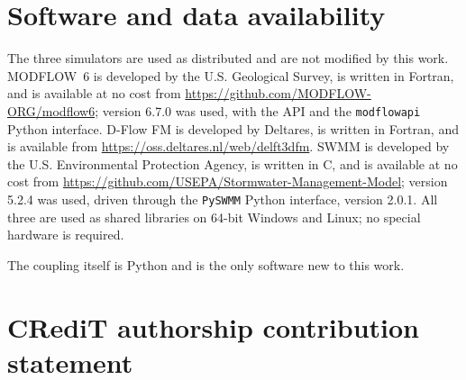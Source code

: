 \documentclass[preprint,authoryear,11pt]{elsarticle}
\begin{document}
\section*{Software and data availability}

The three simulators are used as distributed and are not modified by this work.
MODFLOW~6 is developed by the U.S. Geological Survey, is written in Fortran, and is
available at no cost from \url{https://github.com/MODFLOW-ORG/modflow6}; version
6.7.0 was used, with the API and the \texttt{modflowapi} Python interface. D-Flow FM
is developed by Deltares, is written in Fortran, and is available from
\url{https://oss.deltares.nl/web/delft3dfm}. SWMM is developed by the
U.S. Environmental Protection Agency, is written in C, and is available at no cost
from \url{https://github.com/USEPA/Stormwater-Management-Model}; version 5.2.4 was
used, driven through the \texttt{PySWMM} Python interface, version 2.0.1. All three
are used as shared libraries on 64-bit Windows and Linux; no special hardware is
required.

The coupling itself is Python and is the only software new to this work. %


\section*{CRediT authorship contribution statement}

\end{document}
